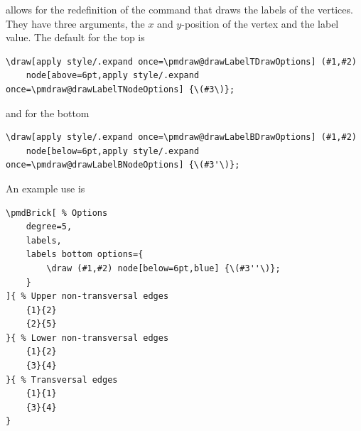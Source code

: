 \documentclass{ltxdoc}
\begin{document}
allows for the redefinition of the command that draws the labels of the vertices. They have three arguments, the \( x \) and \( y \)-position of the vertex and the label value. The default for the top is
\begin{verbatim}
\draw[apply style/.expand once=\pmdraw@drawLabelTDrawOptions] (#1,#2)
    node[above=6pt,apply style/.expand once=\pmdraw@drawLabelTNodeOptions] {\(#3\)};
\end{verbatim}
and for the bottom
\begin{verbatim}
\draw[apply style/.expand once=\pmdraw@drawLabelBDrawOptions] (#1,#2)
    node[below=6pt,apply style/.expand once=\pmdraw@drawLabelBNodeOptions] {\(#3'\)};
\end{verbatim}
An example use is
\begin{center}
    \begin{minipage}{\dimexpr0.85\textwidth-2\fboxrule-2\fboxsep\relax}
        \begin{minipage}[c]{0.4\linewidth}
\begin{verbatim}
\pmdBrick[ % Options
    degree=5,
    labels,
    labels bottom options={
        \draw (#1,#2) node[below=6pt,blue] {\(#3''\)};
    }
]{ % Upper non-transversal edges
    {1}{2}
    {2}{5}
}{ % Lower non-transversal edges
    {1}{2}
    {3}{4}
}{ % Transversal edges
    {1}{1}
    {3}{4}
}
\end{verbatim}
        \end{minipage}
        \hfill
        \begin{minipage}[c]{0.4\linewidth}
        \end{minipage}
    \end{minipage}%
\end{center}
\begin{center}
\end{center}
\end{document}
